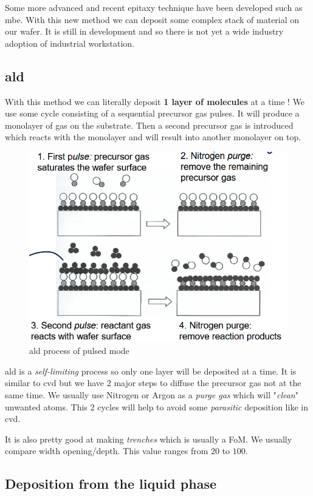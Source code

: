 \documentclass{report}
\begin{document}
Some more advanced and recent epitaxy technique have been developed such as \gls{mbe}. With this new method we can deposit some complex stack of material on our wafer. It is still in development and so there is not yet a wide industry adoption of industrial workstation.

\subsection{\gls{ald}}

With this method we can literally deposit \textbf{1 layer of molecules} at a time ! We use some cycle consisting of a sequential precursor gas pulses. It will produce a monolayer of gas on the substrate. Then a second precursor gas is introduced which reacts with the monolayer and will result into another monolayer on top.

\begin{figure}[H]
    \centering
    \includegraphics[width=0.65\linewidth]{ALD_cycle.png}
    \caption{\gls{ald} process of pulsed mode}
    \label{fig:ALD-pulsed-mode-label}
\end{figure}

\gls{ald} is a \textit{self-limiting} process so only one layer will be deposited at a time. It is similar to \gls{cvd} but we have 2 major steps to diffuse the precursor gas not at the same time. We usually use Nitrogen or Argon as a \textit{purge gas} which will "\textit{clean}" unwanted atoms. This 2 cycles will help to avoid some \textit{parasitic} deposition like in \gls{cvd}.

It is also pretty good at making \textit{trenches} which is usually a FoM. We usually compare width opening/depth. This value ranges from $20$ to $100$.

\subsection{Deposition from the liquid phase}
\end{document}
